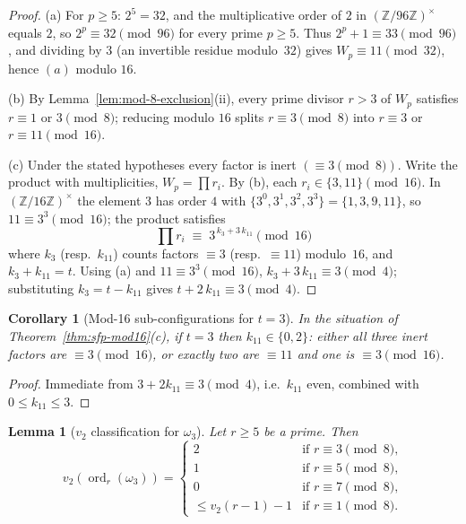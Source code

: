 \documentclass[12pt]{article}
\theoremstyle{plain}
\newtheorem{lemma}[theorem]{Lemma}
\newtheorem{corollary}[theorem]{Corollary}
\theoremstyle{definition}
\theoremstyle{remark}
\begin{document}
\begin{proof}
(a) For \(p \geq 5\): \(2^5 = 32\), and the multiplicative order of
\(2\) in \((\mathbb{Z}/96\mathbb{Z})^\times\) equals \(2\), so
\(2^p \equiv 32 \pmod{96}\) for every prime \(p \geq 5\). Thus
\(2^p + 1 \equiv 33 \pmod{96}\), and dividing by \(3\) (an invertible
residue modulo~\(32\)) gives \(W_p \equiv 11 \pmod{32}\), hence
\((a)\) modulo \(16\).

(b) By Lemma~\ref{lem:mod-8-exclusion}(ii), every prime divisor
\(r > 3\) of \(W_p\) satisfies \(r \equiv 1\) or \(3 \pmod{8}\);
reducing modulo \(16\) splits \(r \equiv 3 \pmod 8\) into
\(r \equiv 3\) or \(r \equiv 11 \pmod{16}\).

(c) Under the stated hypotheses every factor is inert
\((\equiv 3 \pmod{8})\). Write the product with multiplicities,
\(W_p = \prod r_i\). By (b), each \(r_i \in \{3, 11\}
\pmod{16}\). In \((\mathbb{Z}/16\mathbb{Z})^\times\) the element
\(3\) has order \(4\) with
\(\{3^0, 3^1, 3^2, 3^3\} = \{1, 3, 9, 11\}\), so \(11 \equiv 3^3
\pmod{16}\); the product satisfies
\[
  \prod r_i \;\equiv\; 3^{\,k_3 + 3\,k_{11}} \pmod{16}
\]
where \(k_3\) (resp.\ \(k_{11}\)) counts factors \(\equiv 3\)
(resp.\ \(\equiv 11\)) modulo~\(16\), and
\(k_3 + k_{11} = t\). Using (a) and \(11 \equiv 3^3 \pmod{16}\),
\(k_3 + 3\,k_{11} \equiv 3 \pmod 4\); substituting \(k_3 = t -
k_{11}\) gives \(t + 2\,k_{11} \equiv 3 \pmod 4\).\end{proof}

\begin{corollary}[Mod-16 sub-configurations for \(t=3\)]\label{cor:sfp-mod16-t3}
In the situation of Theorem~\ref{thm:sfp-mod16}(c), if \(t = 3\)
then \(k_{11} \in \{0, 2\}\): either all three inert factors are
\(\equiv 3 \pmod{16}\), or exactly two are \(\equiv 11\) and one is
\(\equiv 3 \pmod{16}\).
\end{corollary}
\begin{proof}
Immediate from \(3 + 2 k_{11} \equiv 3 \pmod 4\), i.e.\
\(k_{11}\) even, combined with \(0 \leq k_{11} \leq 3\).\end{proof}

\begin{lemma}[{$v_2$ classification for $\omega_3$}]\label{lem:v2-classification}
Let \(r \geq 5\)
be a prime. Then
\[
v_2(\operatorname{ord}_r(\omega_3)) =
\begin{cases}
2 & \text{if } r \equiv 3 \pmod{8}, \\
1 & \text{if } r \equiv 5 \pmod{8}, \\
0 & \text{if } r \equiv 7 \pmod{8}, \\
\leq v_2(r-1)-1 & \text{if } r \equiv 1 \pmod{8}.
\end{cases}
\]
\end{lemma}
\end{document}
